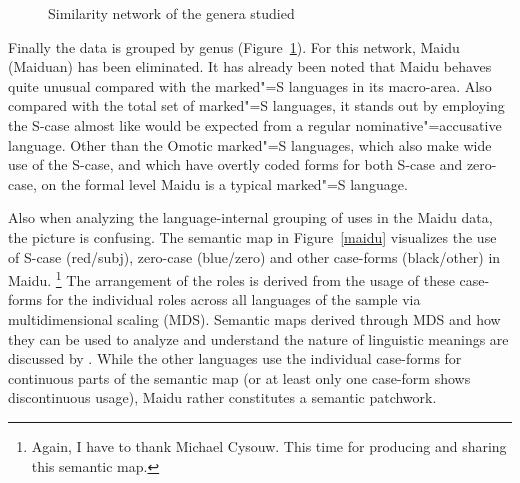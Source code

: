 \begin{figure}[h,t,b,p] \centering {}
\caption{Similarity network of the genera studied}\label{NetGenus}
\end{figure}

Finally the data is grouped by genus (Figure~\ref{NetGenus}). 
For this network, Maidu (Maiduan) has been eliminated.
It has already been noted that Maidu behaves quite unusual compared with the marked"=S languages in its macro-area.
Also compared with the total set of marked"=S languages, it stands out by employing the S-case almost like would be expected from a regular nominative"=accusative language. 
Other than the Omotic marked"=S languages, which also make wide use of the S-case, and which have overtly coded forms for both S-case and zero-case, on the formal level Maidu is a typical marked"=S language. 

Also when analyzing the language-internal grouping of uses in the Maidu data, the picture is confusing. 
The semantic map in Figure~\ref{maidu} visualizes the use of S-case (red/subj), zero-case (blue/zero) and other case-forms (black/other) in Maidu.
\footnote{Again, I have to thank Michael Cysouw. This time for producing and sharing this semantic map.}  
The arrangement of the roles is derived from the usage of these case-forms for the individual roles across all languages of the sample via multidimensional scaling (MDS). 
Semantic maps derived through MDS and how they can be used to analyze and understand the nature of linguistic meanings are discussed by \citet{Cysouw:2010}.
While the other languages use the individual case-forms for continuous parts of the semantic map (or at least only one case-form shows discontinuous usage), Maidu rather constitutes a semantic patchwork.  

